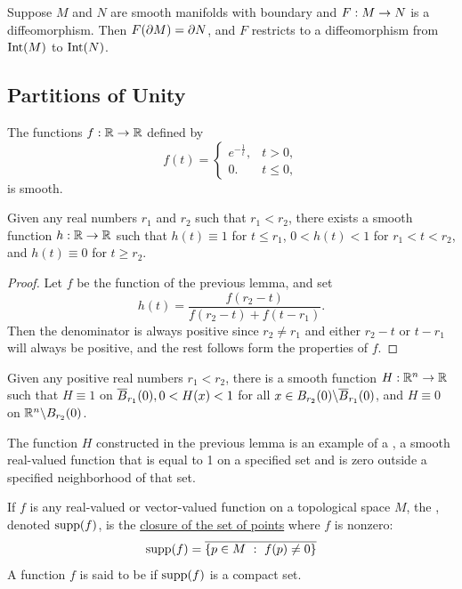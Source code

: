 \begin{thm}
Suppose $M$ and $N$ are smooth manifolds with boundary and $F:M\rightarrow N$ is a diffeomorphism. Then $F(\partial M) = \partial N$, and $F$ restricts to a diffeomorphism from $\text{Int}(M)$ to $\text{Int}(N)$.
\end{thm}
\newpage
\subsection{Partitions of Unity}\nl

\begin{lem}
The functions $f:\mathbb{R}\rightarrow \mathbb{R}$ defined by
\[f(t) = \begin{cases} e^{-\frac{1}{t}}, & t > 0,\\ 0. & t\leq 0,\end{cases}\]
is smooth.
\end{lem}

\begin{lem}
Given any real numbers $r_1$ and $r_2$ such that $r_1 < r_2$, there exists a smooth function $h:\mathbb{R}\rightarrow \mathbb{R}$ such that $h(t) \equiv 1$ for $t\leq r_1$, $0 < h(t) < 1$ for $r_1 < t < r_2$, and $h(t) \equiv 0$ for $t\geq r_2$.
\end{lem}

\begin{proof}
Let $f$ be the function of the previous lemma, and set 
\[h(t) = \frac{f(r_2 - t)}{f(r_2 - t) + f(t - r_1)}.\]
Then the denominator is always positive since $r_2 \neq r_1$ and either $r_2 - t$ or $t - r_1$ will always be positive, and the rest follows form the properties of $f$.
\end{proof}

\begin{lem}
Given any positive real numbers $r_1 < r_2$, there is a smooth function $H:\mathbb{R}^n\rightarrow \mathbb{R}$ such that $H \equiv 1$ on $\overline B_{r_1}(0), 0 < H(x) < 1$ for all $x \in B_{r_2}(0)\backslash \overline B_{r_1}(0)$, and $H\equiv 0$ on $\mathbb{R}^n \backslash B_{r_2}(0)$.
\end{lem}

\dfn The function $H$ constructed in the previous lemma is an example of a , a smooth real-valued function that is equal to 1 on a specified set and is zero outside a specified neighborhood of that set.

\dfn If $f$ is any real-valued or vector-valued function on a topological space $M$, the , denoted $\text{supp}(f)$, is the \ul{closure of the set of points} where $f$ is nonzero:
\[\supp(f) = \ol{\{p\in M\ :\ f(p)\neq 0\}}\]
A function $f$ is said to be  if $\text{supp}(f)$ is a compact set.

